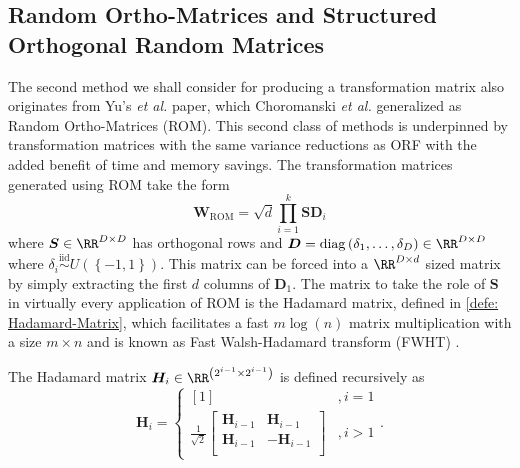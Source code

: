 \subsection{Random Ortho-Matrices and Structured Orthogonal Random Matrices}\label{Section3.3}

The second method we shall consider for producing a transformation matrix also originates from Yu's {\it et al.} paper, which Choromanski {\it et al.} \cite{ChoromanskiKrzysztof2017TUEo} generalized as Random Ortho-Matrices (ROM). This second class of methods is underpinned by transformation matrices with the same variance reductions as ORF with the added benefit of time and memory savings. The transformation matrices generated using ROM take the form
\begin{equation} \label{eq: ROM-general}
    \bm{W}_{\text{ROM}} = \sqrt{d} \prod_{i=1}^{k} \bm{S} \bm{D}_{i}
\end{equation}
where $\bm{S} \in \RR^{D \times D}$ has orthogonal rows and $\bm{D} = \operatorname{diag} \left( \delta_1 , \ldots , \delta_D \right) \in \RR^{D \times D}$ where $\delta_i \stackrel{\text{iid}}{\sim} U \left( \left\{ -1, 1 \right\} \right)$. This matrix can be forced into a $\RR^{D \times d}$ sized matrix by simply extracting the first $d$ columns of $\bm{D}_1$. The matrix to take the role of $\bm{S}$ in virtually every application of ROM is the Hadamard matrix, defined in \ref{defe: Hadamard-Matrix}, which facilitates a fast $m \log (n)$ matrix multiplication with a size $m \times n$ and is known as Fast Walsh-Hadamard transform (FWHT) \cite{Fino1976UMTo}.

\begin{defe} \label{defe: Hadamard-Matrix}
    The Hadamard matrix $\bm{H}_i \in \RR^{\left( 2^{i-1} \times 2^{i-1} \right)}$ is defined recursively as
    \[
        \bm{H}_i =
        \left\{
        \begin{array}{cc}
            \left[ 1 \right] & , i=1 \\
            \frac{1}{\sqrt{2}}
            \begin{bmatrix}
                \bm{H}_{i-1} & \bm{H}_{i-1}   \\
                \bm{H}_{i-1} & - \bm{H}_{i-1} \\
            \end{bmatrix}
                             & , i>1
        \end{array}
        \right. .
    \]
\end{defe}

